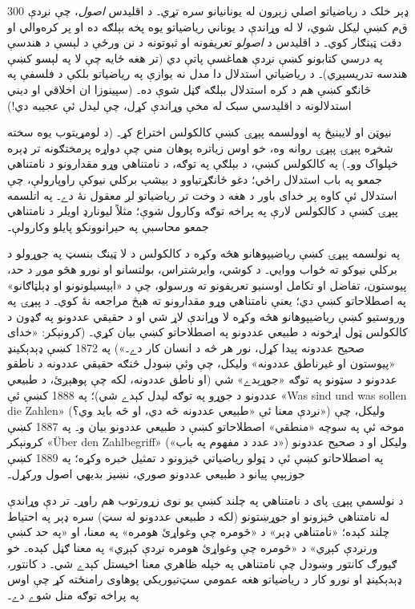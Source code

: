\documentclass[../../../include/open-logic-section]{subfiles}
\begin{document}
ډېر خلک د رياضياتو اصلي زېږون له يونانيانو سره تړي۔ د اقليدس
\emph{اصول}، چې نږدې 300 \textsc{ق‌م} کښې ليکل شوي، لا له وړاندې د
يوناني رياضياتو يوه پخه بېلګه ده او پر کره‌والي او دقت ټينګار کوي۔
د اقليدس د \emph{اصولو} تعريفونه او ثبوتونه د نن ورځې د لېسې د هندسې
په درسي کتابونو کښې نږدې هماغسې پاتې دي (تر هغه ځايه چې لا په لېسو
کښې هندسه تدريسېږي)۔ د رياضياتي استدلال دا مدل نه يوازې په رياضياتو
بلکې د فلسفې په څانګو کښې هم د کره استدلال بېلګه ګڼل شوې ده۔
(سپينوزا ان اخلاقي او ديني استدلالونه د اقليدسي سبک له مخې وړاندې
کړل، چې ليدل ئې عجيبه دي!)

نيوټن او لايبنيڅ په اوولسمه پېړۍ کښې کالکولس اختراع کړ۔ (د لومړيتوب
يوه سخته شخړه پېړۍ پېړۍ روانه وه، خو اوس زياتره پوهان مني چې دواړه
پرمختګونه تر ډېره خپلواک وو۔) په کالکولس کښې، د بېلګې په توګه، د
نامتناهي وړو مقدارونو د نامتناهي جمعو په باب استدلال راځي؛ دغو
ځانګړتياوو د بيشپ برکلي نيوکې راوپارولې، چې استدلال ئې کاوه پر خدای
باور د هغه د وخت تر رياضياتو لږ معقول نۀ دے۔ په اتلسمه پېړۍ کښې د
کالکولس لارې په پراخه توګه وکارول شوې؛ مثلاً ليونارډ اويلر د
نامتناهي جمعو محاسبې په حيرانوونکو پايلو وکارولې۔

په نولسمه پېړۍ کښې رياضيپوهانو هڅه وکړه د کالکولس د لا ټينګ بنسټ په
جوړولو د برکلي نيوکو ته ځواب ووايي۔ د کوشي، وايرشتراس، بولتسانو او
نورو هڅو موږ د حد، پيوستون، تفاضل او تکامل اوسنيو تعريفونو ته
ورسولو، چې د «اېپسيلونونو او ډېلټاګانو» په اصطلاحاتو کښې دي؛ يعنې
نامتناهي وړو مقدارونو ته هېڅ مراجعه نۀ کوي۔ د پېړۍ په وروستيو کښې
رياضيپوهانو هڅه وکړه لا وړاندې لاړ شي او د حقيقي عددونو په ګډون د
کالکولس ټول اړخونه د طبيعي عددونو په اصطلاحاتو کښې بيان کړي۔
(کرونېکر: «خدای صحيح عددونه پيدا کړل، نور هر څه د انسان کار دے۔»)
په 1872 کښې ډېدېکينډ «پيوستون او غيرناطق عددونه» وليکل، چې وئې ښودل
څنګه حقيقي عددونه د ناطقو عددونو د سټونو په توګه «جوړېدے» شي (او
ناطق عددونه، لکه چې پوهېږئ، د طبيعي عددونو د جوړو په توګه ليدل کېدے
شي)؛ په 1888 کښې ئې «Was sind und was sollen die Zahlen» (نږدې معنا
ئې «طبيعي عددونه څه دي، او څه بايد وي؟») وليکل، چې موخه ئې په سوچه
«منطقي» اصطلاحاتو کښې د طبيعي عددونو بيان و۔ په 1887 کښې کرونېکر
«\"Uber den Zahlbegriff» («د عدد د مفهوم په باب») وليکل او د صحيح
عددونو په اصطلاحاتو کښې ئې د ټولو رياضياتي څيزونو د تمثيل خبره وکړه؛
په 1889 کښې جوزېپې پيانو د طبيعي عددونو صوري، نښيز بديهي اصول ورکړل۔

د نولسمې پېړۍ پاى د نامتناهي په چلند کښې يو نوی زړورتوب هم راوړ۔
تر دې وړاندې له نامتناهي څيزونو او جوړښتونو (لکه د طبيعي عددونو له
سټ) سره ډېر په احتياط چلند کېده؛ «نامتناهي ډېر» د «څومره چې وغواړئ
هومره» په معنا، او «په حد کښې ورنږدې کېږي» د «څومره چې وغواړئ هومره
نږدې کېږي» په معنا ګڼل کېده۔ خو ګيورګ کانتور وښودل چې نامتناهي په
خپله ظاهري معنا اخيستل کېدے شي۔ د کانتور، ډېدېکينډ او نورو کار د
رياضياتو هغه عمومي سټ‌تيوريکي پوهاوی رامنځته کړ چې اوس په پراخه توګه
منل شوے دے۔
\end{document}
